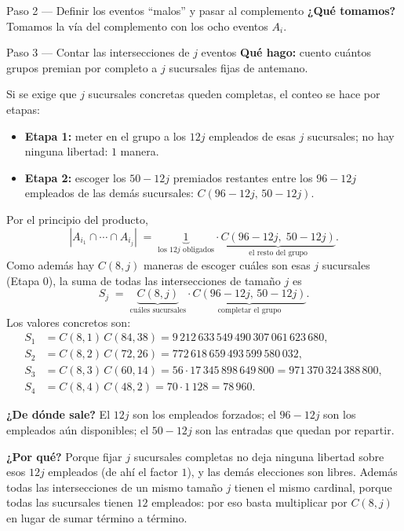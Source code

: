 \documentclass[11pt]{article}
\begin{document}
\begin{sol}
\begin{paso}{Paso 2 --- Definir los eventos ``malos'' y pasar al complemento}
\textbf{¿Qu\'e tomamos?} Tomamos la v\'ia del complemento con los ocho eventos $A_i$.
\end{paso}

\begin{paso}{Paso 3 --- Contar las intersecciones de $j$ eventos}
\textbf{Qu\'e hago:} cuento cu\'antos grupos premian por completo a $j$ sucursales fijas de antemano.

Si se exige que $j$ sucursales concretas queden completas, el conteo se hace por etapas:
\begin{itemize}[leftmargin=*]
  \item \textbf{Etapa 1:} meter en el grupo a los $12j$ empleados de esas $j$ sucursales; no hay ninguna libertad: $1$ manera.
  \item \textbf{Etapa 2:} escoger los $50-12j$ premiados restantes entre los $96-12j$ empleados de las dem\'as sucursales: $C(96-12j,\,50-12j)$.
\end{itemize}
Por el principio del producto,
\[
|A_{i_1}\cap\cdots\cap A_{i_j}| \;=\; \underbrace{1}_{\text{los }12j\text{ obligados}}\cdot\underbrace{C(96-12j,\;50-12j)}_{\text{el resto del grupo}} .
\]
Como adem\'as hay $C(8,j)$ maneras de escoger cu\'ales son esas $j$ sucursales (Etapa 0), la suma de todas las intersecciones de tama\~no $j$ es
\[
S_j \;=\; \underbrace{C(8,j)}_{\text{cu\'ales sucursales}}\cdot\underbrace{C(96-12j,\,50-12j)}_{\text{completar el grupo}} .
\]
Los valores concretos son:
\[
\begin{aligned}
S_1&=C(8,1)\,C(84,38)=9\,212\,633\,549\,490\,307\,061\,623\,680,\\
S_2&=C(8,2)\,C(72,26)=772\,618\,659\,493\,599\,580\,032,\\
S_3&=C(8,3)\,C(60,14)=56\cdot 17\,345\,898\,649\,800=971\,370\,324\,388\,800,\\
S_4&=C(8,4)\,C(48,2)=70\cdot 1\,128=78\,960 .
\end{aligned}
\]

\textbf{¿De d\'onde sale?} El $12j$ son los empleados forzados; el $96-12j$ son los empleados a\'un disponibles; el $50-12j$ son las entradas que quedan por repartir.

\textbf{¿Por qu\'e?} Porque fijar $j$ sucursales completas no deja ninguna libertad sobre esos $12j$ empleados (de ah\'i el factor $1$), y las dem\'as elecciones son libres. Adem\'as todas las intersecciones de un mismo tama\~no $j$ tienen el mismo cardinal, porque todas las sucursales tienen $12$ empleados: por eso basta multiplicar por $C(8,j)$ en lugar de sumar t\'ermino a t\'ermino.


\end{paso}
\end{sol}
\end{document}
